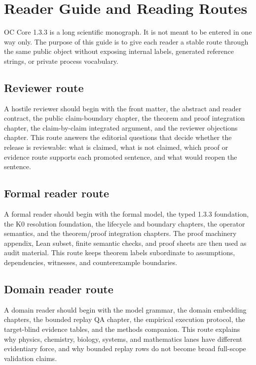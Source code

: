 \section{Reader Guide and Reading Routes}
\label{sec:oc13-reader-contract}

OC Core 1.3.3 is a long scientific monograph. It is not meant to be entered in
one way only. The purpose of this guide is to give each reader a stable route
through the same public object without exposing internal labels, generated
reference strings, or private process vocabulary.

\subsection{Reviewer route}

A hostile reviewer should begin with the front matter, the abstract and reader
contract, the public claim-boundary chapter, the theorem and proof integration
chapter, the claim-by-claim integrated argument, and the reviewer objections
chapter. This route answers the editorial questions that decide whether the
release is reviewable: what is claimed, what is not claimed, which proof or
evidence route supports each promoted sentence, and what would reopen the
sentence.

\subsection{Formal reader route}

A formal reader should begin with the formal model, the typed 1.3.3 foundation,
the K0 resolution foundation, the lifecycle and boundary chapters, the operator
semantics, and the theorem/proof integration chapters. The proof machinery
appendix, Lean subset, finite semantic checks, and proof sheets are then used as
audit material. This route keeps theorem labels subordinate to assumptions,
dependencies, witnesses, and counterexample boundaries.

\subsection{Domain reader route}

A domain reader should begin with the model grammar, the domain embedding
chapters, the bounded replay QA chapter, the empirical execution protocol, the
target-blind evidence tables, and the methods companion. This route explains
why physics, chemistry, biology, systems, and mathematics lanes have different
evidentiary force, and why bounded replay rows do not become broad full-scope
validation claims.


